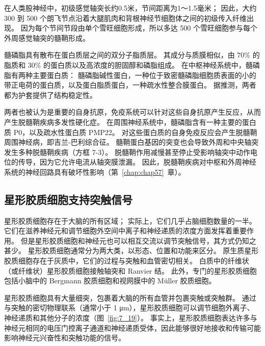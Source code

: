 在人类股神经中，初级感觉轴突长约0.5米，节间距离为1～1.5毫米；
因此，大约 300 到 500 个朗飞节点沿着大腿肌肉和背根神经节细胞体之间的初级传入纤维出现。
因为每个节间节段由单个雪旺细胞形成，所以多达 500 个雪旺细胞参与每个外周感觉轴突的髓鞘形成。


髓磷脂具有散布在蛋白质层之间的双分子脂质层。
其成分与质膜相似，由 70\% 的脂质和 30\% 的蛋白质以及高浓度的胆固醇和磷脂组成。
在中枢神经系统中，髓磷脂有两种主要蛋白质：
髓磷脂碱性蛋白，一种位于致密髓磷脂细胞质表面的小的带正电荷的蛋白质，以及蛋白脂质蛋白，一种疏水性整合膜蛋白。
据推测，两者都为护套提供了结构稳定性。



两者也被认为是重要的自身抗原，免疫系统可以针对这些自身抗原产生反应，从而产生脱髓鞘疾病多发性硬化症。 
在周围神经系统中，髓磷脂含有一种主要的蛋白质 P0，以及疏水性蛋白质 PMP22。
对这些蛋白质的自身免疫反应会产生脱髓鞘周围神经病，即吉兰-巴利综合征。
髓鞘蛋白基因的突变也会导致外周和中央轴突发生多种脱髓鞘疾病（方框 7-3）。
脱髓鞘作用减慢甚至停止受影响轴突中动作电位的传导，因为它允许电流从轴突膜泄漏。
因此，脱髓鞘疾病对中枢和外周神经系统的神经回路具有破坏性影响（第~\ref{chap:chap57}~章）。



\subsection{星形胶质细胞支持突触信号}

星形胶质细胞存在于大脑的所有区域；
实际上，它们几乎占脑细胞数量的一半。
它们在滋养神经元和调节细胞外空间中离子和神经递质的浓度方面发挥着重要作用。
但是星形胶质细胞和神经元也可以相互交流以调节突触信号，其方式仍知之甚少。
星形胶质细胞通常分为两大类，以形态、位置和功能来区分。
原生质星形胶质细胞存在于灰质中，它们的过程与突触和血管密切相关。
白质中的纤维状（或纤维状）星形胶质细胞接触轴突和 Ranvier 结。
此外，专门的星形胶质细胞包括小脑中的 Bergmann 胶质细胞和视网膜中的 Müller 胶质细胞。


星形胶质细胞具有大量细突，包裹着大脑的所有血管并包裹突触或突触群。
通过与突触的密切物理联系（通常小于 1 μm），星形胶质细胞可以调节细胞外离子、神经递质和其他分子的浓度（图~\ref{fig:7_19}）。
事实上，星形胶质细胞表达许多与神经元相同的电压门控离子通道和神经递质受体，因此能够很好地接收和传输可能影响神经元兴奋性和突触功能的信号。


